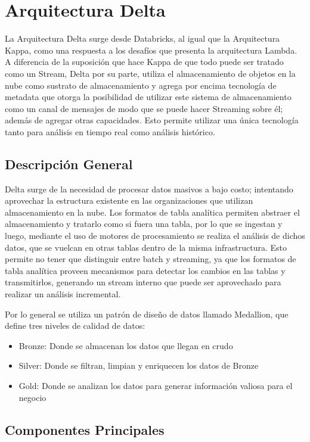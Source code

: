 \section{Arquitectura Delta}


La Arquitectura Delta surge desde Databricks, al igual que la Arquitectura Kappa, 
como una respuesta a los desafíos que presenta la arquitectura Lambda.
A diferencia de la suposición que hace Kappa de que todo puede ser tratado como un Stream, 
Delta por su parte, utiliza el almacenamiento de objetos en la nube como sustrato de almacenamiento y 
agrega por encima tecnología de metadata que otorga la posibilidad de utilizar este sistema de almacenamiento
como un canal de mensajes de modo que se puede hacer Streaming sobre él; además de agregar otras capacidades.
Esto permite utilizar una única tecnología tanto para análisis en tiempo real como análisis histórico. 


\subsection{Descripción General}

Delta surge de la necesidad de procesar datos masivos a bajo costo; intentando aprovechar la estructura existente
en las organizaciones que utilizan almacenamiento en la nube.
Los formatos de tabla analítica permiten abstraer el almacenamiento y tratarlo como si fuera una tabla, 
por lo que se ingestan y luego, mediante el uso de motores de procesamiento se realiza el análisis de dichos datos,
que se vuelcan en otras tablas dentro de la misma infrastructura.
Esto permite no tener que distinguir entre batch y streaming, ya que los formatos de tabla analítica proveen 
mecanismos para detectar los cambios en las tablas y transmitirlos, generando un stream interno que puede ser
aprovechado para realizar un análisis incremental. 

Por lo general se utiliza un patrón de diseño de datos llamado Medallion, que define tres niveles de calidad de datos:
\begin{itemize}
    \item Bronze: Donde se almacenan los datos que llegan en crudo
    \item Silver: Donde se filtran, limpian y enriquecen los datos de Bronze
    \item Gold: Donde se analizan los datos para generar información valiosa para el negocio 
\end{itemize}


\newpage
\subsection{Componentes Principales}

